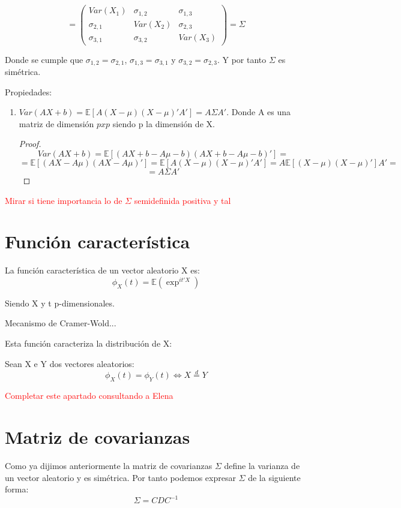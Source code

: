 \documentclass[nochap]{apuntes}
\begin{document}
\begin{itemize}
\[
=\left(
\begin{array}{ccc}
Var(X_1)& \sigma_{1,2}& \sigma_{1,3} \\
\sigma_{2,1}& Var(X_2)& \sigma_{2,3} \\
\sigma_{3,1}& \sigma_{3,2}& Var(X_3)
\end{array}
\right) = \Sigma
\]

Donde se cumple que $\sigma_{1,2}=\sigma_{2,1}$, $\sigma_{1,3}=\sigma_{3,1}$ y $\sigma_{3,2}=\sigma_{2,3}$. Y por tanto $\Sigma$ es simétrica.
\end{itemize}

Propiedades:
\begin{enumerate}
\item $Var(AX+b) = \mathbb{E}\left[ A(X-\mu)(X-\mu)'A' \right]=A \Sigma A'$.  Donde A es una matriz de dimensión $pxp$ siendo p la dimensión de X.
\begin{proof}
\[
Var(AX+b) = \mathbb{E}\left[ (AX+b-A\mu-b)(AX+b-A\mu-b)' \right] =
\]
\[
 =\mathbb{E}\left[ (AX-A\mu)(AX-A\mu)' \right] = \mathbb{E}\left[A(X-\mu)(X-\mu)'A'\right] = A\mathbb{E}\left[(X-\mu)(X-\mu)'\right]A' =
 \]
 \[
 =A \Sigma A'
\]

\end{proof}
\end{enumerate}

\textcolor{red}{Mirar si tiene importancia lo de $\Sigma$ semidefinida positiva y tal}

\section{Función característica}
La función característica de un vector aleatorio X es:
\[
\phi_X(t)=\mathbb{E}(\exp^{it'X})
\]

Siendo X y t p-dimensionales.

\begin{prop} Mecanismo de Cramer-Wold... \end{prop}

Esta función caracteriza la distribución de X:
\begin{prop} Sean X e Y dos vectores aleatorios:
\[
\phi_X(t)=\phi_Y(t) \Leftrightarrow X \stackrel{d}{=} Y
\]

\textcolor{red}{Completar este apartado consultando a Elena}
\end{prop}
\section{Matriz de covarianzas}
Como ya dijimos anteriormente la matriz de covarianzas $\Sigma$ define la varianza de un vector aleatorio y es simétrica. Por tanto podemos expresar $\Sigma$ de la siguiente forma:
\[
\Sigma = CDC^{-1}
\]
\end{document}
